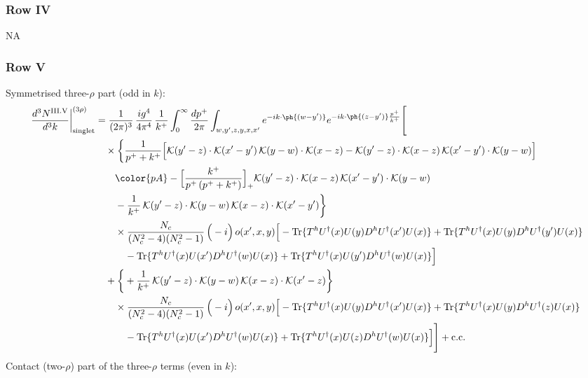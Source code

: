 \subsubsection*{Row IV}
\textsc{NA}
\subsubsection*{Row V}
Symmetrised three-$\rho$ part (odd in $k$):
\begin{align}
\frac{d^{3}N^{\rm III.V}}{d^{3}k}\bigg|^{(3\rho)}_{\rm singlet}&=\frac{1}{(2\pi)^{3}}\,\frac{ig^{4}}{4\pi^{4}}\,\frac{1}{k^{+}}\int_{0}^{\infty}\frac{dp^{+}}{2\pi}\int_{w,y',z,y,x,x'}e^{-ik\cdot\ph{(w-y')}}e^{-ik\cdot\ph{(z-y')}\frac{p^{+}}{k^{+}}}\Bigg[\notag\\
&\quad\times\bigg\{\frac{1}{p^{+}+k^{+}}\Big[\mathcal{K}(y'-z)\cdot\mathcal{K}(x'-y')\,\mathcal{K}(y-w)\cdot\mathcal{K}(x-z)-\mathcal{K}(y'-z)\cdot\mathcal{K}(x-z)\,\mathcal{K}(x'-y')\cdot\mathcal{K}(y-w)\Big]\notag\\
&\qquad{\color{pA}-\Big[\frac{k^{+}}{p^{+}\,(p^{+}+k^{+})}\Big]_{+}\mathcal{K}(y'-z)\cdot\mathcal{K}(x-z)\,\mathcal{K}(x'-y')\cdot\mathcal{K}(y-w)}\notag\\
&\qquad-\frac{1}{k^{+}}\,\mathcal{K}(y'-z)\cdot\mathcal{K}(y-w)\,\mathcal{K}(x-z)\cdot\mathcal{K}(x'-y')\bigg\}\notag\\
&\qquad\times \frac{N_{c}}{(N_{c}^{2}-4)(N_{c}^{2}-1)}\,\Big(-i\Big)\,o(x',x,y)\Big[-{\rm Tr}\{T^{h}U^{\dagger}(x)U(y)D^{h}U^{\dagger}(x')U(x)\}+{\rm Tr}\{T^{h}U^{\dagger}(x)U(y)D^{h}U^{\dagger}(y')U(x)\}\notag\\
&\qquad\quad -{\rm Tr}\{T^{h}U^{\dagger}(x)U(x')D^{h}U^{\dagger}(w)U(x)\}+{\rm Tr}\{T^{h}U^{\dagger}(x)U(y')D^{h}U^{\dagger}(w)U(x)\}\Big]\notag\\
&\quad+\bigg\{+\frac{1}{k^{+}}\,\mathcal{K}(y'-z)\cdot\mathcal{K}(y-w)\,\mathcal{K}(x-z)\cdot\mathcal{K}(x'-z)\bigg\}\notag\\
&\qquad\times \frac{N_{c}}{(N_{c}^{2}-4)(N_{c}^{2}-1)}\,\Big(-i\Big)\,o(x',x,y)\Big[-{\rm Tr}\{T^{h}U^{\dagger}(x)U(y)D^{h}U^{\dagger}(x')U(x)\}+{\rm Tr}\{T^{h}U^{\dagger}(x)U(y)D^{h}U^{\dagger}(z)U(x)\}\notag\\
&\qquad\quad -{\rm Tr}\{T^{h}U^{\dagger}(x)U(x')D^{h}U^{\dagger}(w)U(x)\}+{\rm Tr}\{T^{h}U^{\dagger}(x)U(z)D^{h}U^{\dagger}(w)U(x)\}\Big]\Bigg]+{\rm c.c.}\label{eq:E-III.V-3}
\end{align}
Contact (two-$\rho$) part of the three-$\rho$ terms (even in $k$):
